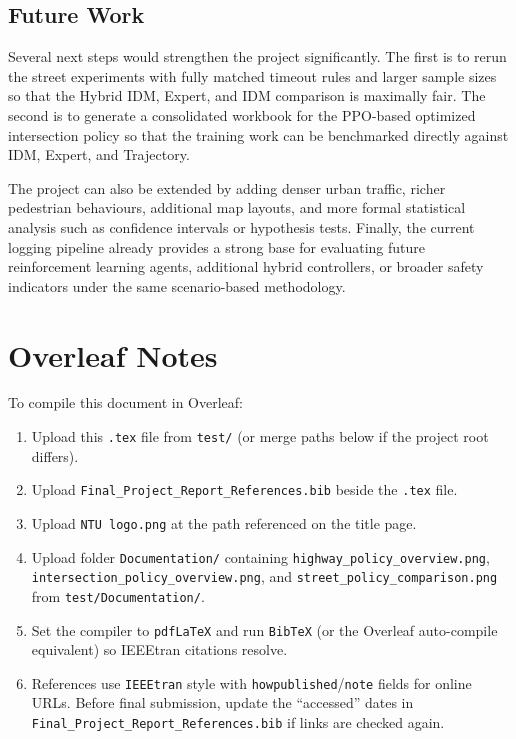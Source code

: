 \documentclass[12pt,a4paper]{report}
\begin{document}
\section{Future Work}
Several next steps would strengthen the project significantly. The first is to rerun the street experiments with fully matched timeout rules and larger sample sizes so that the Hybrid IDM, Expert, and IDM comparison is maximally fair. The second is to generate a consolidated workbook for the PPO-based optimized intersection policy so that the training work can be benchmarked directly against IDM, Expert, and Trajectory.

The project can also be extended by adding denser urban traffic, richer pedestrian behaviours, additional map layouts, and more formal statistical analysis such as confidence intervals or hypothesis tests. Finally, the current logging pipeline already provides a strong base for evaluating future reinforcement learning agents, additional hybrid controllers, or broader safety indicators under the same scenario-based methodology.




\appendix
\chapter{Overleaf Notes}
To compile this document in Overleaf:
\begin{enumerate}[label=\arabic*.]
    \item Upload this \texttt{.tex} file from \texttt{test/} (or merge paths below if the project root differs).
    \item Upload \texttt{Final\_Project\_Report\_References.bib} beside the \texttt{.tex} file.
    \item Upload \texttt{NTU logo.png} at the path referenced on the title page.
    \item Upload folder \texttt{Documentation/} containing \texttt{highway\_policy\_overview.png}, \texttt{intersection\_policy\_overview.png}, and \texttt{street\_policy\_comparison.png} from \texttt{test/Documentation/}.
    \item Set the compiler to \texttt{pdfLaTeX} and run \texttt{BibTeX} (or the Overleaf auto-compile equivalent) so IEEEtran citations resolve.
    \item References use \texttt{IEEEtran} style with \texttt{howpublished}/\texttt{note} fields for online URLs. Before final submission, update the ``accessed'' dates in \texttt{Final\_Project\_Report\_References.bib} if links are checked again.
\end{enumerate}
\end{document}

